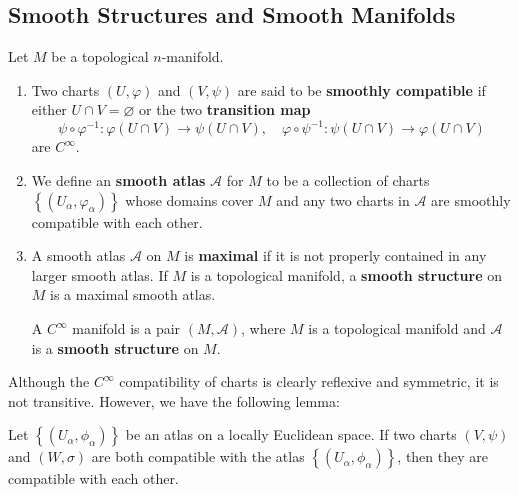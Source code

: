 \documentclass[12pt, oneside]{book}
\begin{document}
\subsection{Smooth Structures and Smooth Manifolds}
\begin{definition}
    Let $M$ be a topological $n$-manifold.
    \begin{enumerate}
        \item
              Two charts $(U, \varphi)$ and $(V, \psi)$ are said to be \textbf{smoothly compatible} if either $U \cap V=\varnothing$ or the two \textbf{transition map}
              \begin{equation*}
                  \psi \circ \varphi^{-1}: \varphi(U \cap V) \rightarrow \psi(U \cap V),\quad
                  \varphi \circ \psi^{-1}: \psi(U \cap V) \rightarrow \varphi(U \cap V)
              \end{equation*}
              are $C^\infty$.

        \item
              We define an \textbf{smooth atlas} $\mathcal{A}$ for $M$ to be a collection of charts $\left\{\left(U_\alpha, \varphi_\alpha\right)\right\}$ whose domains cover $M$ and any two charts in $\mathcal{A}$ are smoothly compatible with each other.

        \item
              A smooth atlas $\mathcal{A}$ on $M$ is \textbf{maximal} if it is not properly contained in any larger smooth atlas.
              If $M$ is a topological manifold, a \textbf{smooth structure} on $M$ is a maximal smooth atlas.

              A $C^\infty$ manifold is a pair $(M, \mathcal{A})$, where $M$ is a topological manifold and $\mathcal{A}$ is a \textbf{smooth structure} on $M$.
    \end{enumerate}
\end{definition}

Although the $C^\infty$ compatibility of charts is clearly reflexive and symmetric, it is
not transitive. However, we have the following lemma:

\begin{lemma}
    Let $\left\{\left(U_\alpha, \phi_\alpha\right)\right\}$ be an atlas on a locally Euclidean space. If two charts $(V, \psi)$ and $(W, \sigma)$ are both compatible with the atlas $\left\{\left(U_\alpha, \phi_\alpha\right)\right\}$, then they are compatible with each other.
\end{lemma}
\end{document}
